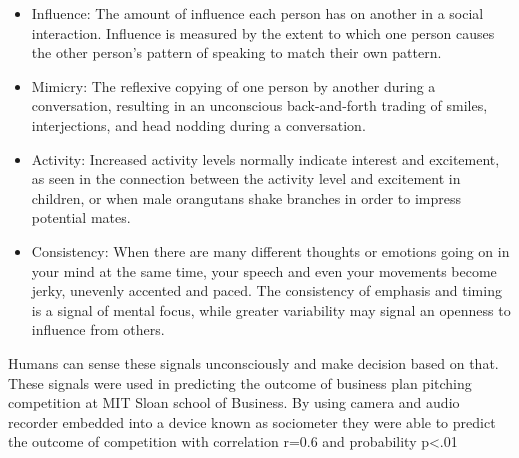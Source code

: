 \documentclass[AER]{AEA}
\begin{document}
\begin{itemize}
\item Influence: The amount of influence each person has on another in a social interaction. Influence is measured by the extent to which one person causes the other person’s pattern of speaking to match 
their own pattern. 
\item Mimicry: The reflexive copying of one person by another during a conversation, resulting in an unconscious back-and-forth trading of smiles, interjections, and head nodding during a conversation. 
\item Activity: Increased activity levels normally indicate interest and excitement, as seen in the connection between the activity level and excitement in children, or when male orangutans shake branches in order to impress potential mates. 
\item
Consistency: When there are many different thoughts or emotions going on in your mind at the same time, your speech and even your movements become jerky, unevenly accented and paced. 
The consistency of emphasis and timing is a signal of mental focus, while greater variability may signal an openness to influence from 
others. 
\end{itemize}
Humans can sense these signals unconsciously and make decision based on that. These signals were used in predicting the outcome of business plan pitching competition at MIT Sloan school of Business. By using camera and audio recorder embedded into a device known as sociometer they were able to predict the outcome of  competition with correlation r=0.6 and probability p<.01
\end{document}
